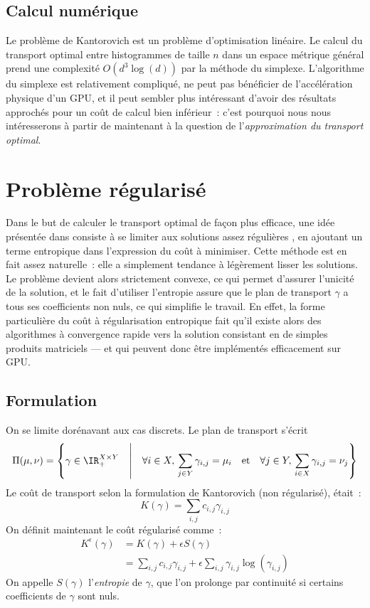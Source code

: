 \subsection{Calcul numérique}
Le problème de Kantorovich est un problème d'optimisation linéaire.
Le calcul du transport optimal entre histogrammes de taille $n$ dans un espace métrique général prend une complexité $O(d^3 \log(d))$ par la méthode du simplexe.
L'algorithme du simplexe est relativement compliqué, ne peut pas bénéficier de l'accélération physique d'un GPU, et il peut sembler plus intéressant d'avoir des résultats approchés pour un coût de calcul bien inférieur~: c'est pourquoi nous nous intéresserons à partir de maintenant à la question de l'\emph{approximation du transport optimal}.

\section{Problème régularisé}
Dans le but de calculer le transport optimal de façon plus efficace, une idée présentée dans \cite{cuturi13} consiste à se limiter aux solutions \og assez régulières \fg, en ajoutant un terme entropique dans l'expression du coût à minimiser. Cette méthode est en fait assez naturelle~: elle a simplement tendance à légèrement lisser les solutions. Le problème devient alors strictement convexe, ce qui permet d'assurer l'unicité de la solution, et le fait d'utiliser l'entropie assure que le plan de transport $\gamma$ a tous ses coefficients non nuls, ce qui simplifie le travail. En effet, la forme particulière du coût à régularisation entropique fait qu'il existe alors des algorithmes à convergence rapide vers la solution consistant en de simples produits matriciels --- et qui peuvent donc être implémentés efficacement sur GPU.

\subsection{Formulation}
On se limite dorénavant aux cas discrets. Le plan de transport s'écrit 
\begin{equation}\label{eq:pi_discret}
\Pi(\mu,\nu) = \left\{ \gamma \in \IR_+^{X \times Y} \quad\middle|\quad
\forall i \in X,\,\sum_{j \in Y} \gamma_{i,j} = \mu_i \quad
 \text{et} \quad
\forall j \in Y ,\,\sum_{i \in X} \gamma_{i,j} = \nu_j \right\}
\end{equation}
Le coût de transport selon la formulation de Kantorovich (non régularisé), était~:
\[K(\gamma) = \sum_{i,j} c_{i,j} \gamma_{i,j} \]
On définit maintenant le coût régularisé comme~:
\begin{equation}\label{eq:keps}
\begin{split}
K^\epsilon (\gamma) 
 &= K(\gamma) + \epsilon S(\gamma) \\
&= \sum_{i,j} c_{i,j} \gamma_{i,j} + \epsilon \sum_{i,j} \gamma_{i,j} \log(\gamma_{i,j}) 
\end{split}\end{equation}
On appelle $S(\gamma)$ l'\emph{entropie} de $\gamma$, que l'on prolonge par continuité si certains coefficients de $\gamma$ sont nuls.

